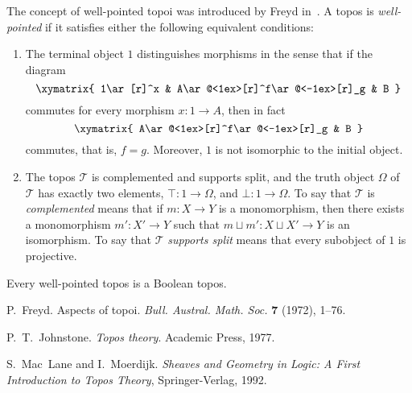 \documentclass[12pt]{article}
\begin{document}

The concept of well-pointed topoi was introduced by Freyd in~\cite{Fr}.  A topos is \emph{well-pointed} if it satisfies either the following equivalent conditions:
\begin{enumerate}
\item
The terminal object $1$ distinguishes morphisms in the sense that if the diagram
\[\xymatrix{
1\ar[r]^x & A\ar@<1ex>[r]^f\ar@<-1ex>[r]_g & B
}\]
commutes for every morphism $x\colon 1\to A$, then in fact 
\[\xymatrix{
A\ar@<1ex>[r]^f\ar@<-1ex>[r]_g & B
}\]
commutes, that is, $f=g$.  Moreover, $1$ is not isomorphic to the initial object.

\item
The topos $\mathcal{T}$ is complemented and supports split, and the truth object $\Omega$ of $\mathcal{T}$ has exactly two elements, $\top\colon 1\to\Omega$, and $\bot\colon 1\to\Omega$.  To say that $\mathcal{T}$ is \emph{complemented} means that if $m\colon X\to Y$ is a monomorphism, then there exists a monomorphism $m'\colon X'\to Y$ such that $m\sqcup m'\colon X\sqcup X'\to Y$ is an isomorphism.  To say that $\mathcal{T}$ \emph{supports split} means that every subobject of $1$ is projective.
\end{enumerate}

Every well-pointed topos is a Boolean topos.

\begin{thebibliography}{99}
P.~Freyd.  Aspects of topoi.  {\it Bull. Austral. Math. Soc.} {\bf 7} (1972), 1--76.

P.~T.~Johnstone.  {\it Topos theory}.  Academic Press, 1977.

S.~Mac~Lane and I.~Moerdijk. {\it Sheaves and Geometry in Logic: A First Introduction to Topos Theory}, Springer-Verlag, 1992.
\end{thebibliography}


\end{document}
